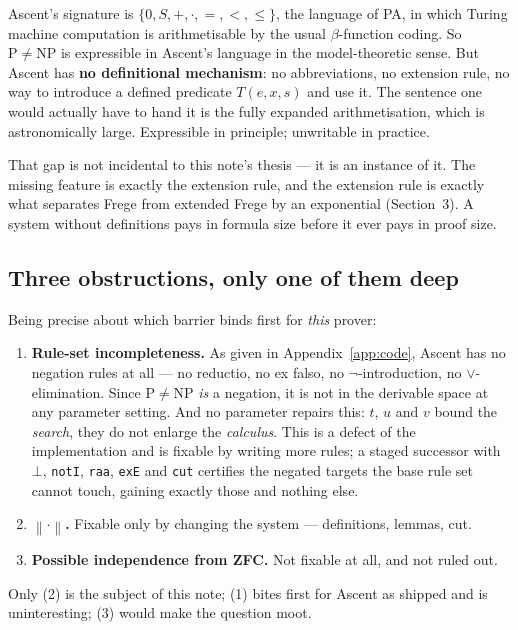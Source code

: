 \documentclass[11pt,a4paper]{article}
\newcommand{\shortest}[1]{\left\lVert #1 \right\rVert}
\begin{document}
Ascent's signature is $\{0, S, +, \cdot, =, <, \le\}$, the language of PA, in
which Turing machine computation is arithmetisable by the usual $\beta$-function
coding. So $\mathrm{P} \neq \mathrm{NP}$ is expressible in Ascent's language in
the model-theoretic sense. But Ascent has \textbf{no definitional mechanism}:
no abbreviations, no extension rule, no way to introduce a defined predicate
$T(e,x,s)$ and use it. The sentence one would actually have to hand it is the
fully expanded arithmetisation, which is astronomically large. Expressible in
principle; unwritable in practice.

That gap is not incidental to this note's thesis --- it is an instance of it.
The missing feature is exactly the extension rule, and the extension rule is
exactly what separates Frege from extended Frege by an exponential
(Section~3). A system without definitions pays in formula size before it ever
pays in proof size.

\subsection{Three obstructions, only one of them deep}

Being precise about which barrier binds first for \emph{this} prover:

\begin{enumerate}
\item \textbf{Rule-set incompleteness.} As given in
Appendix~\ref{app:code}, Ascent has no negation rules at all --- no reductio,
no ex falso, no $\neg$-introduction, no $\vee$-elimination. Since
$\mathrm{P} \neq \mathrm{NP}$ \emph{is} a negation, it is not in the derivable
space at any parameter setting. And no parameter repairs this: $t$, $u$ and
$v$ bound the \emph{search}, they do not enlarge the \emph{calculus}. This is
a defect of the implementation and is fixable by writing more rules; a staged
successor with $\bot$, \texttt{notI}, \texttt{raa}, \texttt{exE} and
\texttt{cut} certifies the negated targets the base rule set cannot touch,
gaining exactly those and nothing else.
\item \textbf{$\shortest{\cdot}$.} Fixable only by changing the system ---
definitions, lemmas, cut.
\item \textbf{Possible independence from ZFC.} Not fixable at all, and not
ruled out.
\end{enumerate}

Only (2) is the subject of this note; (1) bites first for Ascent as shipped
and is uninteresting; (3) would make the question moot.
\end{document}
